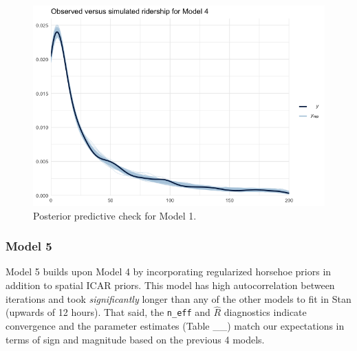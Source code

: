 \documentclass[]{article}
\begin{document}
\begin{figure}[H]
  \centering
  \includegraphics[width = 6in]{ppcheckmod4.png}
  \caption{Posterior predictive check for Model 1.}
\end{figure}

\subsubsection{Model 5}\label{model-5}

Model 5 builds upon Model 4 by incorporating regularized horsehoe priors
in addition to spatial ICAR priors. This model has high autocorrelation
between iterations and took \emph{significantly} longer than any of the
other models to fit in Stan (upwards of 12 hours). That said, the
\texttt{n\_eff} and \(\hat{R}\) diagnostics indicate convergence and the
parameter estimates (Table \_\_) match our expectations in terms of sign
and magnitude based on the previous 4 models.
\end{document}
